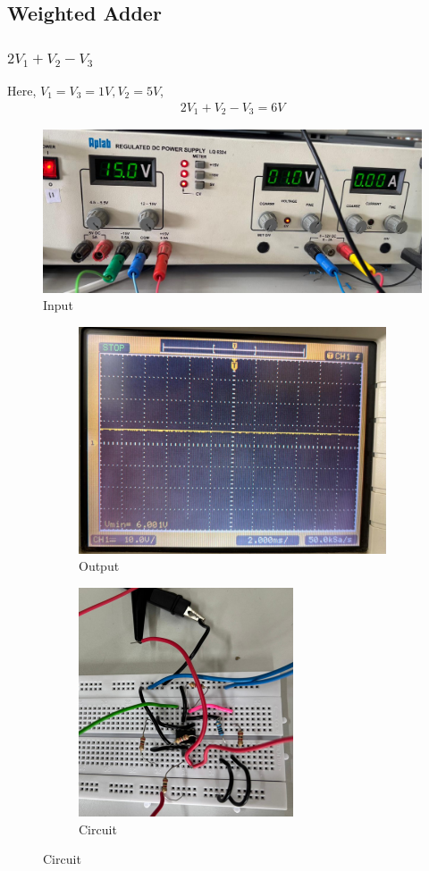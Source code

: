 \documentclass[a4paper,12pt]{article}
\begin{document}
\subsection*{Weighted Adder}
\subsubsection*{$2V_1 + V_2 - V_3$}
Here, $V_1 = V_3 = 1V, V_2 = 5V$, \begin{align*}2V_1+V_2-V_3 = 6V\end{align*}
\begin{figure}[h!]
   \centering
   \includegraphics[width=\columnwidth]{figs/input1.png}
   \caption{Input}
\end{figure}
\pagebreak
\begin{figure}[!h]
	\begin{subfigure}[b]{100pt}
		\caption{Output}
		\includegraphics[width = 260pt]{figs/1add1.png}
	\end{subfigure}
	\hspace{110pt}
	\begin{subfigure}[b]{100pt}
		\caption{Circuit}
		\includegraphics[width = 180pt]{figs/1add2.png}
	\end{subfigure}
\end{figure}
\pagebreak
\end{document}
